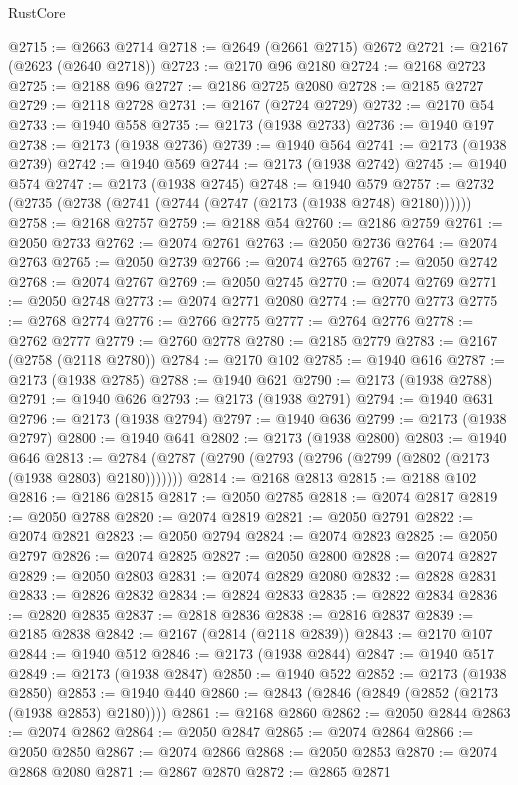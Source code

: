 \begin{lexlean}{RustCore}
\begin{coremodule}
@2715 := @2663 @2714
@2718 := @2649 (@2661 @2715) @2672
@2721 := @2167 (@2623 (@2640 @2718))
@2723 := @2170 @96 @2180
@2724 := @2168 @2723
@2725 := @2188 @96
@2727 := @2186 @2725 @2080
@2728 := @2185 @2727
@2729 := @2118 @2728
@2731 := @2167 (@2724 @2729)
@2732 := @2170 @54
@2733 := @1940 @558
@2735 := @2173 (@1938 @2733)
@2736 := @1940 @197
@2738 := @2173 (@1938 @2736)
@2739 := @1940 @564
@2741 := @2173 (@1938 @2739)
@2742 := @1940 @569
@2744 := @2173 (@1938 @2742)
@2745 := @1940 @574
@2747 := @2173 (@1938 @2745)
@2748 := @1940 @579
@2757 := @2732 (@2735 (@2738 (@2741 (@2744 (@2747 (@2173 (@1938 @2748) @2180))))))
@2758 := @2168 @2757
@2759 := @2188 @54
@2760 := @2186 @2759
@2761 := @2050 @2733
@2762 := @2074 @2761
@2763 := @2050 @2736
@2764 := @2074 @2763
@2765 := @2050 @2739
@2766 := @2074 @2765
@2767 := @2050 @2742
@2768 := @2074 @2767
@2769 := @2050 @2745
@2770 := @2074 @2769
@2771 := @2050 @2748
@2773 := @2074 @2771 @2080
@2774 := @2770 @2773
@2775 := @2768 @2774
@2776 := @2766 @2775
@2777 := @2764 @2776
@2778 := @2762 @2777
@2779 := @2760 @2778
@2780 := @2185 @2779
@2783 := @2167 (@2758 (@2118 @2780))
@2784 := @2170 @102
@2785 := @1940 @616
@2787 := @2173 (@1938 @2785)
@2788 := @1940 @621
@2790 := @2173 (@1938 @2788)
@2791 := @1940 @626
@2793 := @2173 (@1938 @2791)
@2794 := @1940 @631
@2796 := @2173 (@1938 @2794)
@2797 := @1940 @636
@2799 := @2173 (@1938 @2797)
@2800 := @1940 @641
@2802 := @2173 (@1938 @2800)
@2803 := @1940 @646
@2813 := @2784 (@2787 (@2790 (@2793 (@2796 (@2799 (@2802 (@2173 (@1938 @2803) @2180)))))))
@2814 := @2168 @2813
@2815 := @2188 @102
@2816 := @2186 @2815
@2817 := @2050 @2785
@2818 := @2074 @2817
@2819 := @2050 @2788
@2820 := @2074 @2819
@2821 := @2050 @2791
@2822 := @2074 @2821
@2823 := @2050 @2794
@2824 := @2074 @2823
@2825 := @2050 @2797
@2826 := @2074 @2825
@2827 := @2050 @2800
@2828 := @2074 @2827
@2829 := @2050 @2803
@2831 := @2074 @2829 @2080
@2832 := @2828 @2831
@2833 := @2826 @2832
@2834 := @2824 @2833
@2835 := @2822 @2834
@2836 := @2820 @2835
@2837 := @2818 @2836
@2838 := @2816 @2837
@2839 := @2185 @2838
@2842 := @2167 (@2814 (@2118 @2839))
@2843 := @2170 @107
@2844 := @1940 @512
@2846 := @2173 (@1938 @2844)
@2847 := @1940 @517
@2849 := @2173 (@1938 @2847)
@2850 := @1940 @522
@2852 := @2173 (@1938 @2850)
@2853 := @1940 @440
@2860 := @2843 (@2846 (@2849 (@2852 (@2173 (@1938 @2853) @2180))))
@2861 := @2168 @2860
@2862 := @2050 @2844
@2863 := @2074 @2862
@2864 := @2050 @2847
@2865 := @2074 @2864
@2866 := @2050 @2850
@2867 := @2074 @2866
@2868 := @2050 @2853
@2870 := @2074 @2868 @2080
@2871 := @2867 @2870
@2872 := @2865 @2871

\end{coremodule}
\end{lexlean}
